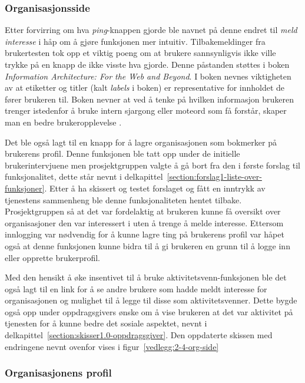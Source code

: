 \subsubsection{Organisasjonsside}

Etter forvirring om hva {\em  ping}-knappen gjorde ble navnet på denne endret til {\em  meld interesse} i håp om å gjøre funksjonen mer intuitiv. Tilbakemeldinger fra brukertesten tok opp et viktig poeng om at brukere sannsynligvis ikke ville trykke på en knapp de ikke visste hva gjorde. Denne påstanden støttes i boken {\em  Information Architecture: For the Web and Beyond}. I boken nevnes viktigheten av at etiketter og titler (kalt {\em  labels} i boken) er representative for innholdet de fører brukeren til. Boken nevner at ved å tenke på hvilken informasjon brukeren trenger istedenfor å bruke intern sjargong eller moteord som få forstår, skaper man en bedre brukeropplevelse \cite{INFARC:1}.

Det ble også lagt til en knapp for å lagre organisasjonen som bokmerker på brukerens profil. Denne funksjonen ble tatt opp under de initielle brukerintervjuene men prosjektgruppen valgte å gå bort fra den i første forslag til funksjonalitet, dette står nevnt i delkapittel~\ref{section:forslag1-liste-over-funksjoner}. Etter å ha skissert og testet forslaget og fått en inntrykk av tjenestens sammenheng ble denne funksjonaliteten hentet tilbake. Prosjektgruppen så at det var fordelaktig at brukeren kunne få oversikt over organisasjoner den var interessert i uten å trenge å melde interesse. Ettersom innlogging var nødvendig for å kunne lagre ting på brukerens profil var håpet også at denne funksjonen kunne bidra til å gi brukeren en grunn til å logge inn eller opprette brukerprofil.

Med den hensikt å øke insentivet til å bruke aktivitetsvenn-funksjonen ble det også lagt til en link for å se andre brukere som hadde meldt interesse for organisasjonen og mulighet til å legge til disse som aktivitetsvenner. Dette bygde også opp under oppdragsgivers ønske om å vise brukeren at det var aktivitet på tjenesten for å kunne bedre det sosiale aspektet, nevnt i delkapittel~\ref{section:skisser1.0-oppdragsgiver}. Den oppdaterte skissen med endringene nevnt ovenfor vises i figur~\ref{vedlegg:2-4-org-side}

\subsubsection{Organisasjonens profil}

